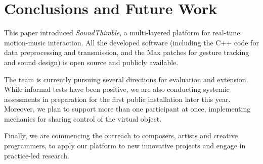 %



\section{Conclusions and Future Work}
\label{sec:conc}

This paper introduced \textit{SoundThimble}, a multi-layered platform for real-time motion-music interaction.
All the developed software (including the C++ code for data preprocessing and transmission, and the Max patches for gesture tracking and sound design) is open source and publicly available.

The team is currently pursuing several directions for evaluation and extension. While informal tests have been positive, we are also conducting systemic assessments in preparation for the first public installation later this year. Moreover, we plan to support more than one participant at once, implementing mechanics for sharing control of the virtual object. %


Finally, we are commencing the outreach to composers, artists and creative programmers, to apply our platform to new innovative projects and engage in practice-led research.
